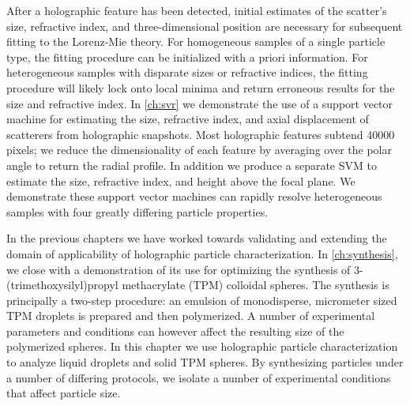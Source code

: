 After a holographic feature has been detected, initial estimates of the
scatter's size, refractive index, and three-dimensional position
are necessary for subsequent fitting to the Lorenz-Mie theory.
For homogeneous samples of a single particle type, the fitting procedure
can be initialized with a priori information. For heterogeneous samples
with disparate sizes or refractive indices, the fitting procedure
will likely lock onto local minima and return erroneous results for
the size and refractive index.
In \autoref{ch:svr} we demonstrate the use of a support vector machine for
estimating the size, refractive index, and axial displacement of scatterers
from holographic snapshots. Most holographic features subtend \SI{40000}{} pixels;
we reduce the dimensionality of each feature by averaging over the polar
angle to return the radial profile. In addition we produce a separate SVM to
estimate the size, refractive index, and height above the focal plane.
We demonstrate these support vector machines can rapidly resolve heterogeneous
samples with four greatly differing particle properties.

In the previous chapters we have worked towards validating and extending
the domain of applicability of holographic particle characterization.
In \autoref{ch:synthesis}, we close with a demonstration of its use for
optimizing the synthesis of 3-(trimethoxysilyl)propyl methacrylate (TPM) colloidal
spheres. The synthesis is principally a two-step procedure: an emulsion of monodisperse,
micrometer sized TPM droplets is prepared and then polymerized.
A number of experimental parameters and conditions can however affect
the resulting size of the polymerized spheres. In this chapter we use
holographic particle characterization to analyze liquid droplets and
solid TPM spheres. By synthesizing particles under a number of
differing protocols, we isolate a number of experimental conditions
that affect particle size.

